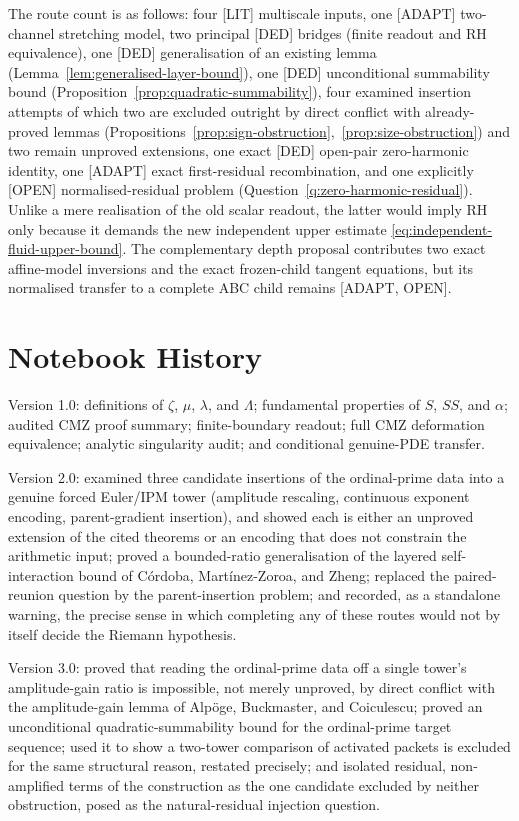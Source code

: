 \documentclass[11pt]{amsart}
\numberwithin{equation}{section}
\theoremstyle{plain}
\theoremstyle{definition}
\theoremstyle{remark}
\begin{document}
The route count is as follows: four \textup{[LIT]} multiscale inputs, one
\textup{[ADAPT]} two-channel stretching model, two principal \textup{[DED]}
bridges (finite readout and RH equivalence), one \textup{[DED]}
generalisation of an existing lemma (Lemma~\ref{lem:generalised-layer-bound}),
one \textup{[DED]} unconditional summability bound
(Proposition~\ref{prop:quadratic-summability}), four examined insertion
attempts of which two are excluded outright by direct conflict with
already-proved lemmas
(Propositions~\ref{prop:sign-obstruction},~\ref{prop:size-obstruction}) and
two remain unproved extensions, one exact \textup{[DED]} open-pair
zero-harmonic identity, one \textup{[ADAPT]} exact first-residual
recombination, and one explicitly \textup{[OPEN]} normalised-residual problem
(Question~\ref{q:zero-harmonic-residual}).  Unlike a mere realisation of the
old scalar readout, the latter would imply RH only because it demands the new
independent upper estimate \eqref{eq:independent-fluid-upper-bound}.  The
complementary depth proposal contributes two exact affine-model inversions and
the exact frozen-child tangent equations, but its normalised transfer to a
complete ABC child remains \textup{[ADAPT, OPEN]}.

\section*{Notebook History}
\label{sec:notebook-history}

Version 1.0: definitions of $\zeta$, $\mu$, $\lambda$, and $\Lambda$;
fundamental properties of $S$, $SS$, and $\alpha$; audited CMZ proof summary;
finite-boundary readout; full CMZ deformation equivalence; analytic
singularity audit; and conditional genuine-PDE transfer.

Version 2.0: examined three candidate insertions of the ordinal-prime data
into a genuine forced Euler/IPM tower (amplitude rescaling, continuous
exponent encoding, parent-gradient insertion), and showed each is either an
unproved extension of the cited theorems or an encoding that does not
constrain the arithmetic input; proved a bounded-ratio generalisation of the
layered self-interaction bound of C\'ordoba, Mart\'inez-Zoroa, and Zheng;
replaced the paired-reunion question by the parent-insertion problem; and
recorded, as a standalone warning, the precise sense in which completing any
of these routes would not by itself decide the Riemann hypothesis.

Version 3.0: proved that reading the ordinal-prime data off a single
tower's amplitude-gain ratio is impossible, not merely unproved, by direct
conflict with the amplitude-gain lemma of Alp\"oge, Buckmaster, and
Coiculescu; proved an unconditional quadratic-summability bound for the
ordinal-prime target sequence; used it to show a two-tower comparison of
activated packets is excluded for the same structural reason, restated
precisely; and isolated residual, non-amplified terms of the construction
as the one candidate excluded by neither obstruction, posed as the
natural-residual injection question.
\end{document}
